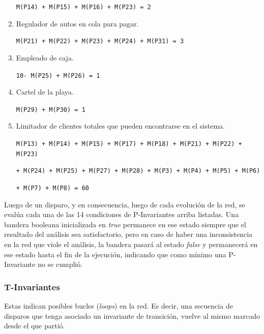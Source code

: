\documentclass[12pt,a4paper]{article}
\begin{document}
\begin{enumerate}
        \verb|M(P14) + M(P15) + M(P16) + M(P23) = 2 |

\item Regulador de autos en cola para pagar.

        \verb|M(P21) + M(P22) + M(P23) + M(P24) + M(P31) = 3|
        
\item Empleado de caja.

        \verb|10- M(P25) + M(P26) = 1 |     
        
\item Cartel de la playa.        

        \verb|M(P29) + M(P30) = 1|
        
\item Limitador de clientes totales que pueden encontrarse en el sistema.

        \verb|M(P13) + M(P14) + M(P15) + M(P17) + M(P18) + M(P21) + M(P22) + M(P23) |
        
        \verb|+ M(P24) + M(P25) + M(P27) + M(P28) + M(P3) + M(P4) + M(P5) + M(P6) |
        
        \verb|+ M(P7) + M(P8) = 60|   
\end{enumerate}

Luego de un disparo, y en consecuencia, luego de cada evolución de la red, se evalúa cada una de las 14 condiciones de P-Invariantes arriba listadas. 
Una bandera booleana inicializada en \textit{true} permanece en ese estado siempre que el resultado del análisis sea satisfactorio, pero en caso de haber una inconsistencia en la red que viole el análisis, la bandera pasará al estado \textit{false} y permanecerá en ese estado hasta el fin de la ejecución, indicando que como mínimo una P-Invariante no se cumplió.

\subsubsection{T-Invariantes}
Estas indican posibles bucles (\emph{loops}) en la red. Es decir, una secuencia de disparos que tenga asociado un invariante de transición, vuelve al mismo marcado desde el que partió.
\end{document}
